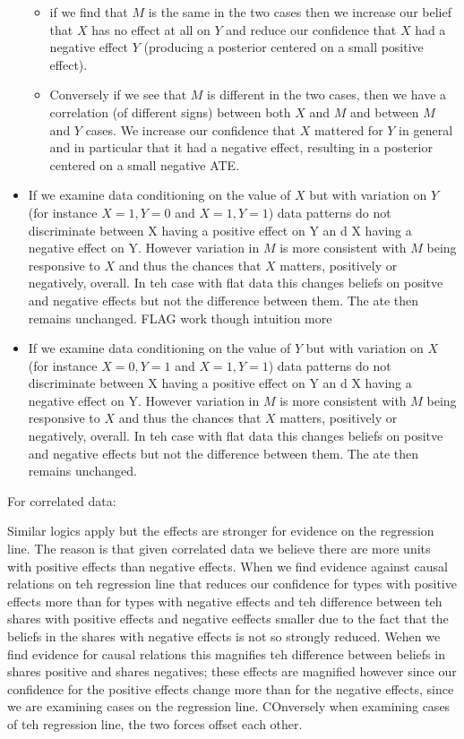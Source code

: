 \documentclass[12pt,]{book}
\providecommand{\tightlist}{%
  \setlength{\itemsep}{0pt}\setlength{\parskip}{0pt}}
\begin{document}
\begin{itemize}
  \begin{itemize}
  \tightlist
  \item
    if we find that \(M\) is the same in the two cases then we increase our belief that \(X\) has no effect at all on \(Y\) and reduce our confidence that \(X\) had a negative effect \(Y\) (producing a posterior centered on a small positive effect).
  \item
    Conversely if we see that \(M\) is different in the two cases, then we have a correlation (of different signs) between both \(X\) and \(M\) and between \(M\) and \(Y\) cases. We increase our confidence that \(X\) mattered for \(Y\) in general and in particular that it had a negative effect, resulting in a posterior centered on a small negative ATE.
  \end{itemize}
\item
  If we examine data conditioning on the value of \(X\) but with variation on \(Y\) (for instance \(X=1, Y=0\) and \(X=1, Y=1\))
  data patterns do not discriminate between X having a positive effect on Y an d X having a negative effect on Y. However variation in \(M\) is more consistent with \(M\) being responsive to \(X\) and thus the chances that \(X\) matters, positively or negatively, overall. In teh case with flat data this changes beliefs on positve and negative effects but not the difference between them. The ate then remains unchanged. FLAG work though intuition more
\item
  If we examine data conditioning on the value of \(Y\) but with variation on \(X\) (for instance \(X=0, Y=1\) and \(X=1, Y=1\))
  data patterns do not discriminate between X having a positive effect on Y an d X having a negative effect on Y. However variation in \(M\) is more consistent with \(M\) being responsive to \(X\) and thus the chances that \(X\) matters, positively or negatively, overall. In teh case with flat data this changes beliefs on positve and negative effects but not the difference between them. The ate then remains unchanged.
\end{itemize}

For correlated data:

Similar logics apply but the effects are stronger for evidence on the regression line. The reason is that given correlated data we believe there are more units with positive effects than negative effects. When we find evidence against causal relations on teh regression line that reduces our confidence for types with positive effects more than for types with negative effects and teh difference between teh shares with positive effects and negative eeffects smaller due to the fact that the beliefs in the shares with negative effects is not so strongly reduced. Wehen we find evidence for causal relations this magnifies teh difference between beliefs in shares positive and shares negatives; these effects are magnified however since our confidence for the positive effects change more than for the negative effects, since we are examining cases on the regression line. COnversely when examining cases of teh regression line, the two forces offset each other.
\end{document}
